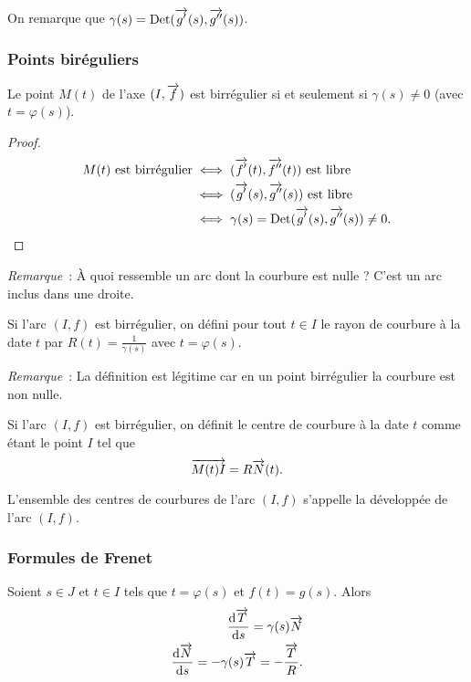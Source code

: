 On remarque que \(\gamma(s)=\operatorname{Det}(\overrightarrow{g'}(s), \overrightarrow{g''}(s))\).

\subsubsection{Points biréguliers}

\begin{prop}
  Le point \(M(t)\) de l'axe \((I, \overrightarrow{f})\) est birrégulier si et seulement si \(\gamma(s)\neq 0\) (avec \(t=\varphi(s)\)).
\end{prop}
\begin{proof}
  \begin{align}
    M(t) \text{~est birrégulier} &\iff (\overrightarrow{f'}(t), \overrightarrow{f''}(t)) \text{~est libre}\\
    &\iff (\overrightarrow{g'}(s), \overrightarrow{g''}(s)) \text{~est libre}\\
    &\iff \gamma(s)=\operatorname{Det}(\overrightarrow{g'}(s), \overrightarrow{g''}(s)) \neq 0.
  \end{align}
\end{proof}

\emph{Remarque}~: À quoi ressemble un arc dont la courbure est nulle ? C'est un arc inclus dans une droite.

\begin{defdef}
  Si l'arc \((I,f)\) est birrégulier, on défini pour tout \(t \in I\) le rayon de courbure à la date \(t\) par \(R(t) = \frac{1}{\gamma(s)}\) avec \(t=\varphi(s)\).
\end{defdef}

\emph{Remarque}~: La définition est légitime car en un point birrégulier la courbure est non nulle.

\begin{defdef}
  Si l'arc \((I,f)\) est birrégulier, on définit le centre de courbure à la date \(t\) comme étant le point \(I\) tel que
  \begin{equation}
    \overrightarrow{M(t)I} = R \overrightarrow{N}(t).
  \end{equation}
\end{defdef}
L'ensemble des centres de courbures de l'arc \((I, f)\) s'appelle la développée de l'arc \((I, f)\).

\subsubsection{Formules de Frenet}

Soient \(s \in J\) et \(t \in I\) tels que \(t=\varphi(s)\) et \(f(t)=g(s)\). Alors
\begin{align}
  \dfrac{\mathrm{d} \overrightarrow{T}}{\mathrm{d} s} = \gamma(s) \overrightarrow{N} \\
  \dfrac{\mathrm{d} \overrightarrow{N}}{\mathrm{d} s} = -\gamma(s)\overrightarrow{T}=-\frac{\overrightarrow{T}}{R}.
\end{align}

